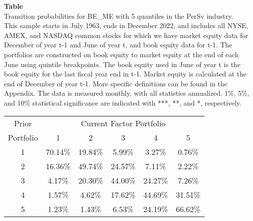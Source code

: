 \begin{table*}[ht!]
\raggedright
{}
\label{tab: transition_probs_BE_ME_PerSv_with_5_quantiles}
\textbf{Table \thetable} \\
Transition probabilities for BE_ME with 5 quantiles in the PerSv industry. \\
\hspace*{1em}This sample starts in July 1963, ends in December 2022, and includes all NYSE, AMEX, and NASDAQ common stocks for which we have market equity data for December of year t-1 and June of year t, and book equity data for t-1. The portfolios are constructed on book equity to market equity at the end of each June using quintile breakpoints.  The book equity used in June of year t is the book equity for the last fiscal year end in t-1.  Market equity is calculated at the end of December of year t-1.  More specific definitions can be found in the Appendix.  The data is measured monthly, with all statistics annualized.  1\%, 5\%, and 10\% statistical significance are indicated with ***, **, and *, respectively. \\
\vspace{0.5em}
\centering
\begin{adjustbox}{max width=\textwidth}
\begin{tabular}{@{}cccccc@{}}
\toprule
Prior & \multicolumn{5}{c}{Current Factor Portfolio} \\
Portfolio & 1 & 2 & 3 & 4 & 5 \\
\midrule
1 & 70.14\% & 19.84\% & 5.99\% & 3.27\% & 0.76\% \\
2 & 16.36\% & 49.74\% & 24.57\% & 7.11\% & 2.22\% \\
3 & 4.17\% & 20.30\% & 44.00\% & 24.27\% & 7.26\% \\
4 & 1.57\% & 4.62\% & 17.62\% & 44.69\% & 31.51\% \\
5 & 1.23\% & 1.43\% & 6.53\% & 24.19\% & 66.62\% \\
\bottomrule
\end{tabular}
\end{adjustbox}
\end{table*}